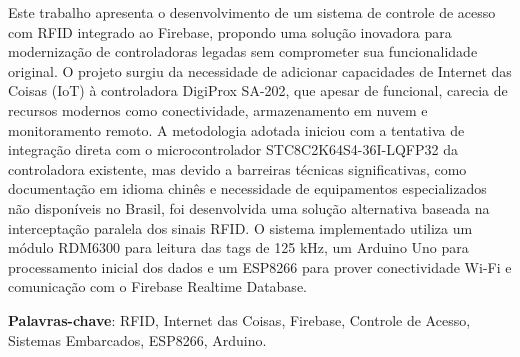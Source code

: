 %
%


Este trabalho apresenta o desenvolvimento de um sistema de controle de acesso com RFID integrado ao Firebase, propondo uma solução inovadora para modernização de controladoras legadas sem comprometer sua funcionalidade original. O projeto surgiu da necessidade de adicionar capacidades de Internet das Coisas (IoT) à controladora DigiProx SA-202, que apesar de funcional, carecia de recursos modernos como conectividade, armazenamento em nuvem e monitoramento remoto. A metodologia adotada iniciou com a tentativa de integração direta com o microcontrolador STC8C2K64S4-36I-LQFP32 da controladora existente, mas devido a barreiras técnicas significativas, como documentação em idioma chinês e necessidade de equipamentos especializados não disponíveis no Brasil, foi desenvolvida uma solução alternativa baseada na interceptação paralela dos sinais RFID. O sistema implementado utiliza um módulo RDM6300 para leitura das tags de 125 kHz, um Arduino Uno para processamento inicial dos dados e um ESP8266 para prover conectividade Wi-Fi e comunicação com o Firebase Realtime Database. 

\vspace{1.5ex}

{\bf Palavras-chave}: RFID, Internet das Coisas, Firebase, Controle de Acesso, Sistemas Embarcados, ESP8266, Arduino.

